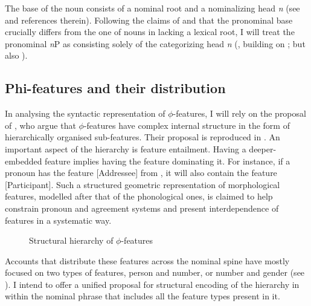 \documentclass[output=paper,colorlinks,citecolor=brown]{langscibook}
\begin{document}
The base of the noun consists of a nominal root and a nominalizing head \textit{n} (see \citealt{kramerbook} and references therein). 
Following the claims of \citet{moskaldiss,moskal15} and \citet{smithetal18} that the pronominal base crucially differs from the one of nouns in lacking a lexical root, I will treat the pronominal \textit{n}P as consisting solely of the categorizing head \textit{n} (\citealt{vanurkpronouns}, building on \citealt{postal69,elbourne05}; but also \citealt{dechainewiltschko, vankoppen12}). 

\subsection{Phi-features and their distribution}\label{subsec:phifeaturesanddistribution}

In analysing the syntactic representation of $\phi$-features, I will rely on the proposal of \citet{harleyritter02}, who argue that $\phi$-features have complex internal structure in the form of hierarchically organised sub-features. Their proposal is reproduced in . An important aspect of the hierarchy is feature entailment. Having a deeper-embedded feature implies having the feature dominating it. For instance, if a pronoun has the feature [Addressee] from , it will also contain the feature [Participant]. Such a  structured geometric representation of morphological features, modelled after that of the phonological ones, is claimed to help constrain pronoun and agreement systems and present interdependence of features in a systematic way.

\begin{figure}
    \caption{Structural hierarchy of $\phi$-features \citep[486]{harleyritter02}}
    \label{fig:hierarchy}
\end{figure}

Accounts that distribute these features across the nominal spine have mostly focused on two types of features, person and number, or number and gender (see \citealt{bejarrezac09,vankoppen12,puskarsyntax,puskarglossapredicate,caha21}). I intend to offer a unified proposal for structural encoding of the hierarchy in  within the nominal phrase that includes all the feature types present in it. 
\end{document}
